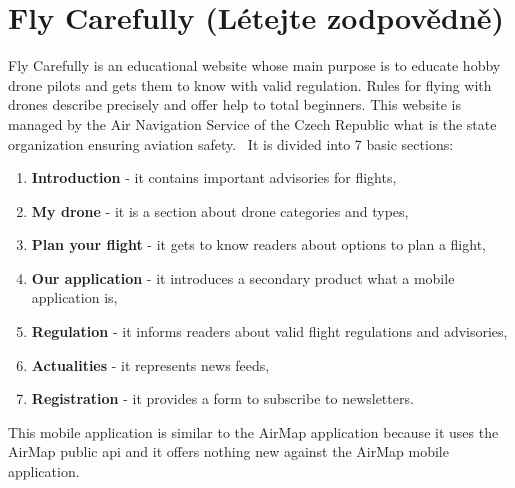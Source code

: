 \section{Fly Carefully (L{\' e}tejte zodpov{\v e}dn{\v e})}\label{sec:fly-carefully}
Fly Carefully is an educational website whose main purpose is to educate hobby drone pilots and gets them to know with valid regulation.
Rules for flying with drones describe precisely and offer help to total beginners.
This website is managed by the Air Navigation Service of the Czech Republic what is the state organization ensuring aviation safety.~\cite{flyCarefully}
It is divided into 7 basic sections:
\begin{enumerate}
    \item \textbf{Introduction} - it contains important advisories for flights,
    \item \textbf{My drone} - it is a section about drone categories and types,
    \item \textbf{Plan your flight} - it gets to know readers about options to plan a flight,
    \item \textbf{Our application} - it introduces a secondary product what a mobile application is,
    \item \textbf{Regulation} - it informs readers about valid flight regulations and advisories,
    \item \textbf{Actualities} - it represents news feeds,
    \item \textbf{Registration} - it provides a form to subscribe to newsletters.
\end{enumerate}
This mobile application is similar to the AirMap application because it uses the AirMap public \acrshort{api} and it offers nothing new against the AirMap mobile application.
